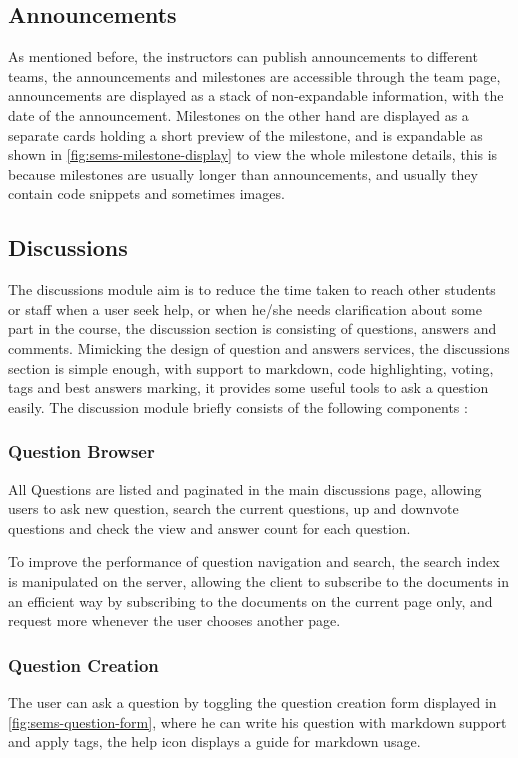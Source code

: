 \subsection{Announcements}
\label{sub:announcements}
As mentioned before, the instructors can publish announcements to different teams, the announcements and milestones are accessible through the
team page, announcements are displayed as a stack of non-expandable information, with the date of the announcement. Milestones on the other hand are
displayed as a separate cards holding a short preview of the milestone, and is expandable as shown in \ref{fig:sems-milestone-display} to view
the whole milestone details, this is because milestones are usually longer than announcements, and usually they contain code snippets and sometimes
images.


\subsection{Discussions}
\label{sub:discussions}
The discussions module aim is to reduce the time taken to reach other students or staff when a user seek help, or when he/she needs
clarification about some part in the course, the discussion section is consisting of questions, answers and comments. Mimicking the
design of question and answers services, the discussions section is simple enough, with support to markdown, code highlighting, voting, tags and
best answers marking, it provides some useful tools to ask a question easily. The discussion module briefly consists of the following components :

\subsubsection{Question Browser}
\label{subs:question-browser}
All Questions are listed and paginated in the main discussions page, allowing users to ask new question, search the current questions, up and
downvote questions and check the view and answer count for each question.

\newParagraph
To improve the performance of question navigation and search, the search index is manipulated on the server, allowing the client to subscribe to
the documents in an efficient way by subscribing to the documents on the current page only, and request more whenever the user chooses another page.

\subsubsection{Question Creation}
\label{subs:question-creation}
The user can ask a question by toggling the question creation form displayed in \ref{fig:sems-question-form}, where he can
write his question with markdown support and apply tags, the help icon displays a guide for markdown usage.
